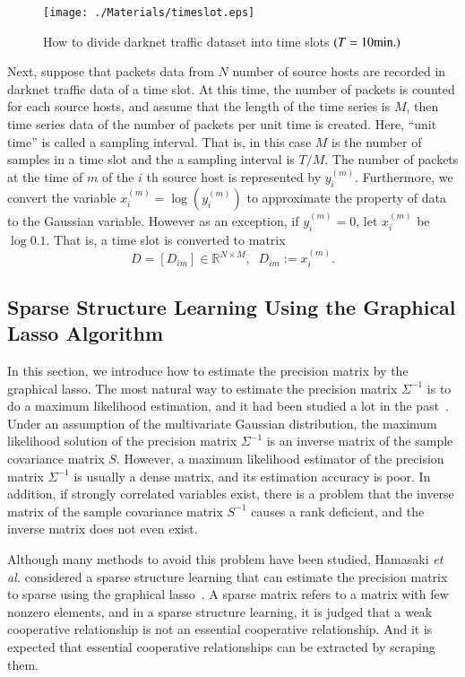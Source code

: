 \documentclass{sig-alternate-10pt}
\begin{document}
\begin{figure}[htbp]
	\texttt{[image: ./Materials/timeslot.eps]}
	\caption{How to divide darknet traffic dataset into time slots $(T={\rm 10min.})$}
  	\label{fig:timeslot}
\end{figure}

Next, suppose that packets data from $N$ number of source hosts are recorded in darknet traffic data of a time slot.
At this time, the number of packets is counted for each source hosts, and assume that the length of the time series is $M$, then time series data of the number of packets per unit time is created.
Here, ``unit time'' is called a sampling interval.
That is, in this case $M$ is the number of samples in a time slot and the a sampling interval is $T/M$.
The number of packets at the time of $m$ of the $i$ th source host is represented by $y_i^{(m)}$.
Furthermore, we convert the variable $x_i^{(m)}=\log(y_i^{(m)})$ to approximate the property of data to the Gaussian variable.
However as an exception, if $y_i^{(m)}=0$, let $x_i^{(m)}$ be $\log0.1$.
That is, a time slot is converted to matrix
\begin{equation}
\label{eq:d}
D=[D_{im}]\in\mathbb{R}^{N \times M},
\;\;D_{im} := x_i^{(m)}.
\end{equation}


\subsection{Sparse Structure Learning Using the Graphical Lasso Algorithm}
In this section, we introduce how to estimate the precision matrix by the graphical lasso.
The most natural way to estimate the precision matrix $\Sigma^{-1}$ is to do a maximum likelihood estimation, and it had been studied a lot in the past~\cite{Dempster, Meinshausen}.
Under an assumption of the multivariate Gaussian distribution, the maximum likelihood solution of the precision matrix $\Sigma^{-1}$ is an inverse matrix of the sample covariance matrix $S$.
However, a maximum likelihood estimator of the precision matrix $\Sigma^{-1}$ is usually a dense matrix, and its estimation accuracy is poor.
In addition, if strongly correlated variables exist, there is a problem that the inverse matrix of the sample covariance matrix $S^{-1}$ causes a rank deficient, and the inverse matrix does not even exist.

Although many methods to avoid this problem have been studied, Hamasaki {\it et al.} considered a sparse structure learning that can estimate the precision matrix to sparse using the graphical lasso~\cite{Friedman}.
A sparse matrix refers to a matrix with few nonzero elements, and in a sparse structure learning, it is judged that a weak cooperative relationship is not an essential cooperative relationship. 
And it is expected that essential cooperative relationships can be extracted by scraping them.
\end{document}
